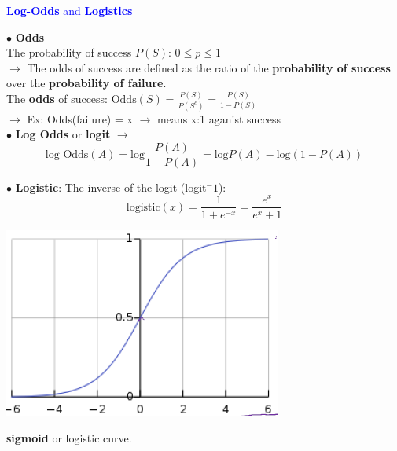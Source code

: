 \documentclass[letterpaper, 10.5pt,landscape]{article}
\begin{document}
\begin{multicols*}{3}
\textcolor{blue}{\textbf{Log-Odds} and \textbf{Logistics}} 

\vspace{2pt}
$\bullet$ \textbf{Odds} \\
The probability of success $P(S)$:  \( 0 \leq p \leq 1\)\\
$\rightarrow$ The odds of success are defined as the ratio of the \textbf{probability of success} over the \textbf{probability of failure}. \\
The \textbf{odds} of success: \( \text{Odds}(S) = \frac{P(S)}{P(S^{c})} = \frac{P(S)}{1-P(S)} \) \\
$\rightarrow$ Ex: Odds(failure) = x $\rightarrow$ means x:1 aganist success \\

\vspace{3pt}
$\bullet$ \textbf{Log Odds} or \textbf{logit} $\rightarrow$
\vspace{-7pt}
\[\text{log Odds}(A) = \text{log} \frac{P(A)}{1-P(A)} = \text{log}P(A) - \text{log}\left(1-P(A) \right) \]
\vspace{-7pt}

\vspace{3pt}
$\bullet$ \textbf{Logistic}: The inverse of the logit (logit$^-1$): 
\vspace{-3pt}
\[\boxed{\text{logistic}(x) = \frac{1}{1+e^{-x}} = \frac{e^{x}}{e^{x} +1} }\]

\vspace{-3pt}


\begin{minipage}{0.5\linewidth}
    \centering
    \includegraphics[width=\textwidth]{figures/Logistics_sigmoid_curve.PNG}
\end{minipage}
\textbf{sigmoid} or logistic curve. \\


\end{multicols*}
\end{document}
